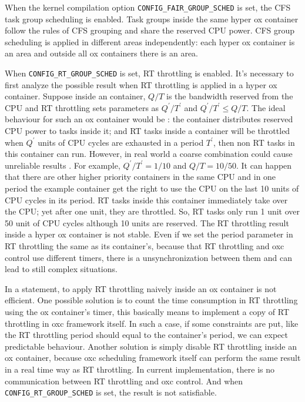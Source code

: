 When the kernel compilation option \texttt{CONFIG\_FAIR\_GROUP\_SCHED} is set, 
the CFS task group scheduling is enabled. Task groups inside the same hyper ox 
container follow the rules of CFS grouping and share the reserved CPU power. 
CFS group scheduling is applied in different areas independently: 
each hyper ox container is an area and outside all ox containers there
is an area. 

When \texttt{CONFIG\_RT\_GROUP\_SCHED} is set, RT throttling is enabled.
It's necessary to first analyze the possible result when RT throttling 
is applied in a hyper ox container. Suppose inside an container, $Q/T$ 
is the bandwidth reserved from the CPU and RT throttling sets parameters as 
$Q^{'}/T^{'}$ and $Q^{'}/T^{'} \le Q/T$. The ideal behaviour for such an
ox container would be : the container distributes reserved CPU power 
to tasks inside it; and RT tasks inside a container will be throttled when
$Q^{'}$ units of CPU cycles are exhausted in a period $T^{'}$, then non
RT tasks in this container can run. However, in real world a coarse 
combination could cause unreliable results . For example, 
$Q^{'}/T^{'} = 1/10$ and $Q/T = 10/50$. It can happen that there are other 
higher priority containers in the same CPU and in one period the example 
container get the right to use the CPU on the last 10 units of CPU cycles 
in its period. RT tasks inside this container immediately take over the CPU; 
yet after one unit, they are throttled. So, RT tasks only run 1 unit over 
50 unit of CPU cycles although 10 units are reserved. The RT throttling 
result inside a hyper ox container is not stable. Even if we set the period 
parameter in RT throttling the same as its container's, because that RT
throttling and oxc control use different timers, there is a unsynchronization 
between them and can lead to still complex situations.

In a statement, to apply RT throttling naively inside an ox container 
is not efficient. One possible solution is to count the time 
consumption in RT throttling using the ox container's timer, 
this basically means to implement a copy of RT throttling in oxc 
framework itself. In such a case, if some constraints are put, like
the RT throttling period should equal to the container's period, 
we can expect predictable behaviour. Another solution is simply disable 
RT throttling inside an ox container, because oxc scheduling framework 
itself can perform the same result in a real time way as RT throttling. 
In current implementation, there is no communication between RT throttling
and oxc control. And when \texttt{CONFIG\_RT\_GROUP\_SCHED} is set, the 
result is not satisfiable.

